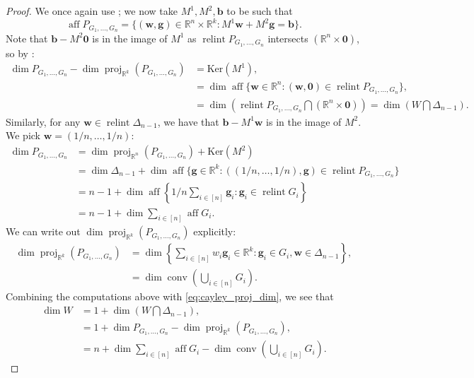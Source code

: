 \documentclass[10pt]{article}
\theoremstyle{definition}
\theoremstyle{remark}
\newcommand{\R}{\mathbb{R}}
\DeclareMathOperator{\conv}{conv}
\DeclareMathOperator{\relint}{relint}
\DeclareMathOperator{\aff}{aff}
\DeclareMathOperator{\proj}{proj}
\renewcommand{\vec}[1]{\mathbf{#1}}
\renewcommand{\ker}{\text{Ker}}
\begin{document}
\begin{proof}
		We once again use \cite[Theorem 2.4]{balas1998dimension}; we now take $M^1,M^2, \vec b$ to be such that 
		$$
		\aff P_{G_1, \dots, G_n} = \{(\vec w,\vec g) \in \R^n \times \R^k : M^1 \vec w + M^2 \vec g = \vec b \}.
		$$
		Note that $\vec b - M^2 \vec 0$ is in the image of $M^1$ as $\relint P_{G_1, \dots, G_n}$ intersects $(\R^n \times \vec 0)$, so by \cite[Theorem 2.4]{balas1998dimension}: 
		\begin{align}
			\dim P_{G_1,\dots,G_n} - \dim \proj_{\R^k}(P_{G_1,\dots,G_n}) &= \ker(M^1), \nonumber\\
			&= \dim \aff \{ \vec w \in \R^n : (\vec w,\vec 0) \in \relint P_{G_1, \dots, G_n} \}, \nonumber\\
			&= \dim \left( \relint P_{G_1, \dots, G_n} \textstyle\bigcap (\R^n \times \vec 0) \right) = \dim \left(W \textstyle\bigcap \Delta_{n-1}\right).\label{eq:cayley_proj_dim}
		\end{align}
		Similarly, for any $\vec w \in \relint \Delta_{n-1}$, we have that $\vec b - M^1 \vec w$ is in the image of $M^2$. We pick $\vec w = (1/n,\dots, 1/n)$:
		\begin{align*}
			\dim P_{G_1,\dots,G_n} &= \dim \proj_{\R^n}(P_{G_1,\dots,G_n})+ \ker(M^2) \\
			&= \dim \Delta_{n-1} + \dim \aff \{ \vec g \in \R^k : ((1/n,\dots, 1/n),\vec g) \in \relint P_{G_1,\dots,G_n} \} \\
			&= n-1+ \dim \aff \left\{ 1/n \textstyle\sum_{i \in [n]} \vec g_i: \vec g_i \in \relint G_i \right\} \\
			&= n-1+ \dim \textstyle \sum_{i \in [n]} \aff G_i.
		\end{align*}
		We can write out $\dim \proj_{\R^k}(P_{G_1,\dots,G_n})$ explicitly:
		\begin{align*}
			\dim \proj_{\R^k}(P_{G_1,\dots,G_n}) &= \dim \left\{ \textstyle \sum_{i \in [n]} w_i \vec g_i \in \R^k : \vec g_i \in G_i, \vec w \in \Delta_{n-1} \right\}, \\
			&= \dim \conv \left( \textstyle \bigcup_{i \in [n]} G_i \right).
		\end{align*}
		Combining the computations above with \cref{eq:cayley_proj_dim}, we see that
		\begin{align*}
			\dim W &= 1 + \dim (W \textstyle\bigcap \Delta_{n-1}), \\
			&= 1 + \dim P_{G_1,\dots,G_n} - \dim \proj_{\R^k}(P_{G_1,\dots,G_n}), \\
			&= n+\dim \textstyle \sum_{i \in [n]} \aff G_i - \dim \conv \left( \textstyle \bigcup_{i \in [n]} G_i \right).

\end{align*}
\end{proof}
\end{document}
